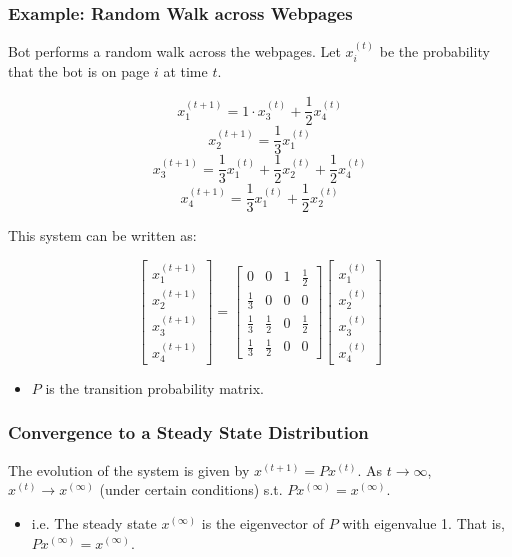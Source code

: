 \subsubsection{Example: Random Walk across Webpages}
\begin{example}
    Bot performs a random walk across the webpages. Let $x_i^{(t)}$ be the probability that the bot is on page $i$ at time $t$. 

\[
x_1^{(t+1)} = 1 \cdot x_3^{(t)} + \frac{1}{2} x_4^{(t)}
\]
\[
x_2^{(t+1)} = \frac{1}{3} x_1^{(t)}
\]
\[
x_3^{(t+1)} = \frac{1}{3} x_1^{(t)} + \frac{1}{2} x_2^{(t)} + \frac{1}{2} x_4^{(t)}
\]
\[
x_4^{(t+1)} = \frac{1}{3} x_1^{(t)} + \frac{1}{2} x_2^{(t)}
\]

This system can be written as:

\begin{equation*}
\begin{bmatrix}
x_1^{(t+1)} \\
x_2^{(t+1)} \\
x_3^{(t+1)} \\
x_4^{(t+1)}
\end{bmatrix}
=
\begin{bmatrix}
0 & 0 & 1 & \frac{1}{2} \\
\frac{1}{3} & 0 & 0 & 0 \\
\frac{1}{3} & \frac{1}{2} & 0 & \frac{1}{2} \\
\frac{1}{3} & \frac{1}{2} & 0 & 0 
\end{bmatrix}
\begin{bmatrix}
x_1^{(t)} \\
x_2^{(t)} \\
x_3^{(t)} \\
x_4^{(t)}
\end{bmatrix}
\end{equation*}
\begin{itemize}
    \item $P$ is the transition probability matrix. 
\end{itemize}
\vspace{1em}
\end{example}

\subsubsection{Convergence to a Steady State Distribution}
\begin{definition}
    The evolution of the system is given by $x^{(t+1)} = P x^{(t)}$. As $t \to \infty$, $x^{(t)} \to x^{(\infty)}$ (under certain conditions) s.t. $Px^{(\infty)}=x^{(\infty)}$.
    \begin{itemize}
        \item i.e. The steady state $x^{(\infty)}$ is the eigenvector of $P$ with eigenvalue 1. That is, $P x^{(\infty)} = x^{(\infty)}$. 
    \end{itemize}
\end{definition}

